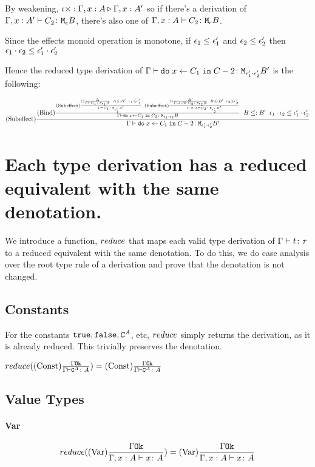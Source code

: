 {    By weakening, $\iota\times : \Gamma, x:A \triangleright \Gamma, x: A'$ so if there's a derivation of $\Gamma, x:A' \vdash C_2 \colon \texttt{M}_{\epsilon}{B}$, there's also one of   $\Gamma, x: A \vdash C_2 \colon \texttt{M}_{\epsilon}{B}$.

    Since the effects monoid operation is monotone, if $\epsilon_1\leq\epsilon_1'$ and $\epsilon_2\leq\epsilon_2'$ then $\epsilon_1\cdot\epsilon_2 \leq \epsilon_1'\cdot\epsilon_2'$

    Hence the reduced type derivation of $\Gamma \vdash \texttt{do}\; x \leftarrow C_1 \;\texttt{in}\; C-2 \colon \texttt{M}_{\epsilon_1'\cdot\epsilon_2'}{B'}$ is the following:

    \begin{equation}
        (\text{Subeffect}) \frac{
            (\text{Bind}) \frac{
                (\text{Subeffect}) \frac{(\text{}) \frac{\Delta}{\Gamma \vdash C_1 \colon \texttt{M}_{\epsilon_1}{A}}\;\; A \leq: A'\;\; \epsilon_1 \leq \epsilon_1'}{\Gamma \vdash C_1 \colon \texttt{M}_{\epsilon_1'}{A'}}
                \;\;
                (\text{Subeffect}) \frac{(\text{}) \frac{\Delta'}{\Gamma, x:A \vdash C_2 \colon \texttt{M}_{\epsilon_2}{B}}\;\; B \leq: B'\;\; \epsilon_2 \leq \epsilon_2'}{\Gamma, x:A \vdash C_2 \colon \texttt{M}_{\epsilon_2'}{B'}}
            }{
                \Gamma \vdash \texttt{do}\; x \leftarrow C_1 \;\texttt{in}\; C_2 \colon \texttt{M}_{\epsilon_1\cdot\epsilon_2}{B}
            }
            \;\;
            B\leq: B'
            \;\;
            \epsilon_1\cdot\epsilon_2\leq\epsilon_1'\cdot\epsilon_2'
        }{
            \Gamma \vdash \texttt{do}\; x \leftarrow C_1 \;\texttt{in}\; C-2 \colon \texttt{M}_{\epsilon_1'\cdot\epsilon_2'}{B'}
        }
    \end{equation}

    \section{Each type derivation has a reduced equivalent with the same denotation.}
    We introduce a function, $reduce$ that maps each valid type derivation of $\Gamma \vdash t \colon \tau$ to a reduced equivalent with the same denotation. To do this, we do case analysis over the root type rule of a derivation and prove that the denotation is not changed.

        \subsection{Constants}
            For the constants $\texttt{true}, \texttt{false}, \texttt{C}^{A}$, etc, $reduce$ simply returns the derivation, as it is already reduced. This trivially preserves the denotation.

            $reduce((\text{Const}) \frac{\Gamma \texttt{Ok}}{\Gamma \vdash \texttt{C}^{A} \colon A}) = (\text{Const}) \frac{\Gamma \texttt{Ok}}{\Gamma \vdash \texttt{C}^{A} \colon A}$

        \subsection{Value Types}
            \paragraph{Var}
            \begin{equation}
                reduce((\text{Var}) \frac{\Gamma \texttt{Ok}}{\Gamma, x: A \vdash x \colon A}) =  (\text{Var}) \frac{\Gamma \texttt{Ok}}{\Gamma, x: A \vdash x \colon A}
            \end{equation}

}
